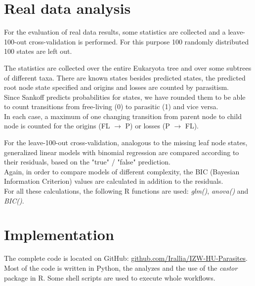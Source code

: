   \section{Real data analysis} \label{sec:methods - real data analysis}
    For the evaluation of real data results, some statistics are collected and a leave-100-out 
      cross-validation is performed. For this purpose 100 randomly distributed 100 states are left out.

    The statistics are collected over the entire Eukaryota tree and over some subtrees of different 
      taxa. There are known states besides predicted states, the predicted root node state specified 
      and origins and losses are counted by parasitism. \\
    Since Sankoff predicts probabilities for states, we have rounded them to be able to count 
      transitions from free-living (0) to parasitic (1) and vice versa. \\
    In each case, a maximum of one changing transition from parent node to child node is counted for 
      the origins (FL $\rightarrow$ P) or losses (P $\rightarrow$ FL).
    
    For the leave-100-out cross-validation, analogous to the missing leaf node states, generalized 
      linear models with binomial regression are compared according to their residuals, based on the 
      "true" / "false" prediction. \\
    Again, in order to compare models of different complexity, the BIC (Bayesian Information Criterion) 
      values are calculated in addition to the residuals. \\
    For all these calculations, the following R functions are used: \textit{glm()}, \textit{anova()} 
      and \textit{BIC()}. \\

  \section{Implementation}
    The complete code is located on GitHub: 
      \hyperlink{github.com/Irallia/IZW-HU-Parasites}{github.com/Irallia/IZW-HU-Parasites}. \\
    Most of the code is written in Python, the analyzes and the use of the \textit{castor} package in R. Some 
      shell scripts are used to execute whole workflows.

